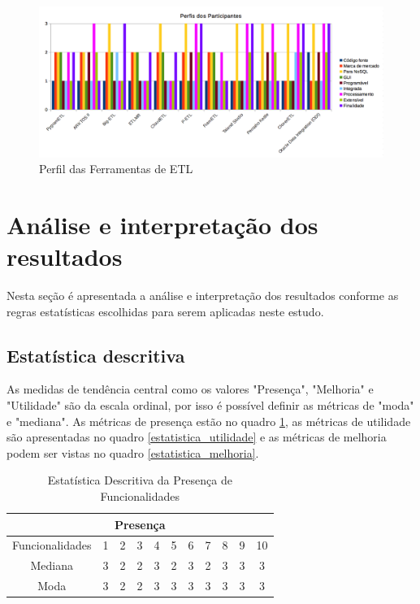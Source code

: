 \begin{figure}[h]
\centering
\includegraphics[scale=0.38]{fig/perfil.png}
\caption{Perfil das Ferramentas de ETL}
\label{perfil}
\end{figure}

\section{Análise e interpretação dos resultados}

Nesta seção é apresentada a análise e interpretação dos resultados conforme as regras estatísticas escolhidas para serem aplicadas neste estudo. 

\subsection{Estatística descritiva}

As medidas de tendência central como os valores "Presença", "Melhoria" e "Utilidade" são da escala ordinal, por isso é possível definir as métricas de "moda" e "mediana". As métricas de presença estão no quadro \ref{estatistica_presenca}, as métricas de utilidade são apresentadas no quadro \ref{estatistica_utilidade} e as métricas de melhoria podem ser vistas no quadro \ref{estatistica_melhoria}.

\begin{table}[h]
	\centering
	\caption{Estatística Descritiva da Presença de Funcionalidades}
	\label{estatistica_presenca}
	\begin{tabular}{|c|c|c|c|c|c|c|c|c|c|c|}
			\hline
			\multicolumn{11}{|c|}{Presença}\\
			\hline
			Funcionalidades & 1 & 2 & 3 & 4 & 5 & 6 & 7 & 8 & 9 & 10 \\
			\hline
			Mediana & 3 & 2 & 2 & 3 & 2 & 3 &2 & 3 & 3 & 3 \\
			\hline
			Moda & 3 & 2 & 2 & 3 & 3 & 3 & 3 & 3 & 3 & 3 \\
			\hline
					
			
	\end{tabular}
\end{table}

